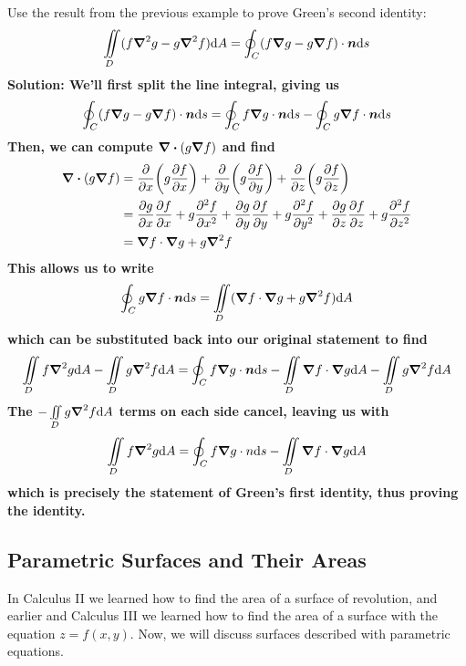\begin{example}
    Use the result from the previous example to prove Green's second identity:
    \[ \iint\limits_D (f\boldsymbol\nabla^2 g - g\boldsymbol\nabla^2 f)\dd A = \oint_C (f\grad g - g\grad f)\cdot \boldsymbol{n} \dd s\]
    \bf{Solution:} We'll first split the line integral, giving us
    \[ \oint_C (f\grad g - g\grad f)\cdot \boldsymbol{n} \dd s = \oint_C f\grad g \cdot \boldsymbol{n} \dd s - \oint_C g\grad f\cdot \boldsymbol{n} \dd s\]
    Then, we can compute $\div (g\grad f)$ and find
    \begin{align*}
        \div (g\grad f) &= \pdv{x}\pqty{g\pdv{f}{x}}+\pdv{y}\pqty{g\pdv{f}{y}}+\pdv{z}\pqty{g\pdv{f}{z}} \\
        &=\pdv{g}{x}\pdv{f}{x} + g\pdv[2]{f}{x} + \pdv{g}{y}\pdv{f}{y}+g\pdv[2]{f}{y}+\pdv{g}{z}\pdv{f}{z}+g\pdv[2]{f}{z} \\
        &= \grad f \cdot \grad g + g\lap f
    \end{align*}
    This allows us to write
    \[ \oint_C g\grad f \cdot \boldsymbol{n} \dd s = \iint\limits_D (\grad f\cdot \grad g + g\boldsymbol\nabla^2 f)\dd A\]
    which can be substituted back into our original statement to find
    \[ \iint\limits_Df\boldsymbol\nabla^2 g\dd A - \iint\limits_D g\boldsymbol\nabla^2 f\dd A = \oint_C f\grad g\cdot \boldsymbol{n} \dd s - \iint\limits_D \grad f\cdot \grad g \dd A - \iint\limits_D g\boldsymbol\nabla^2 f\dd A\]
    The $-\iint\limits_D g\boldsymbol\nabla^2 f\dd A$ terms on each side cancel, leaving us with
    \[ \iint\limits_D f\boldsymbol\nabla^2 g \dd A = \oint_C f\grad g\cdot n \dd s - \iint\limits_D \grad f\cdot \grad g\dd A\]
    which is precisely the statement of Green's first identity, thus proving the identity.
\end{example}
\subsection{Parametric Surfaces and Their Areas}
In Calculus II we learned how to find the area of a surface of revolution, and earlier and Calculus III we learned how to find the area of a surface with the equation $z=f(x,y)$. Now, we will discuss surfaces described with parametric equations. 
